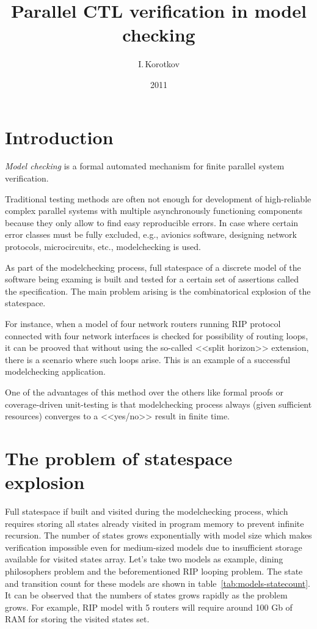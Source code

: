 \documentclass[a4paper,notitlepage,14pt]{article}
\title{Parallel CTL verification in model checking}
\author{I.\,Korotkov}
\date{2011}
\begin{document}
\maketitle

\section{Introduction}
\label{sec:introduction}

\emph{Model checking} is a formal automated mechanism for finite parallel system verification.

Traditional testing methods are often not enough for development of high-reliable complex
parallel systems with multiple asynchronously functioning components because they only
allow to find easy reproducible errors. In case where certain error classes must be fully
excluded, e.g., avionics software, designing network protocols, microcircuits, etc.,
modelchecking is used.

As part of the modelchecking process, full statespace of a discrete model of the software
being examing is built and tested for a certain set of assertions called the
specification. The main problem arising is the combinatorical explosion of the statespace.

For instance, when a model of four network routers running RIP protocol connected with four
network interfaces is checked for possibility of routing loops, it can be prooved that
without using the so-called <<split horizon>> extension, there is a scenario where such
loops arise. This is an example of a successful modelchecking application.

One of the advantages of this method over the others like formal proofs or coverage-driven
unit-testing is that modelchecking process always (given sufficient resources) converges
to a <<yes/no>> result in finite time.

\section{The problem of statespace explosion}
\label{sec:probl-stat-expl}

Full statespace if built and visited during the modelchecking process, which requires
storing all states already visited in program memory to prevent infinite recursion. The
number of states grows exponentially with model size which makes verification impossible
even for medium-sized models due to insufficient storage available for visited states
array. Let's take two models as example, dining philosophers problem and the beforementioned
RIP looping problem. The state and transition count for these models are shown in
table~\ref{tab:models-statecount}. It can be observed that the numbers of states grows
rapidly as the problem grows. For example, RIP model with 5 routers will require around
100 Gb of RAM for storing the visited states set.
\end{document}
